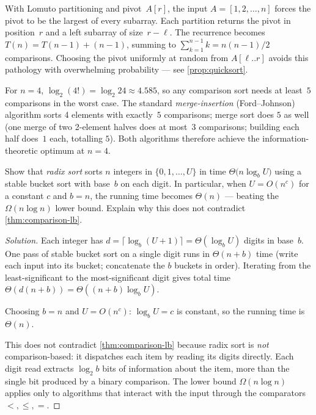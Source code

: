 \begin{example}
\label{ex:quicksort-worst}
With Lomuto partitioning and pivot~$A[r]$, the input $A = [1, 2, \dots, n]$
forces the pivot to be the largest of every subarray. Each partition
returns the pivot in position~$r$ and a left subarray of size~$r - \ell$.
The recurrence becomes $T(n) = T(n - 1) + (n - 1)$, summing to
$\sum_{k=1}^{n-1} k = n(n-1)/2$ comparisons. Choosing the pivot
uniformly at random from $A[\ell..r]$ avoids this pathology with
overwhelming probability — see \cref{prop:quicksort}.
\end{example}

\begin{example}
\label{ex:lb-tight}
For $n = 4$, $\log_2 (4!) = \log_2 24 \approx 4.585$, so any
comparison sort needs at least~$5$ comparisons in the worst case.
The standard \emph{merge-insertion} (Ford--Johnson) algorithm sorts
4 elements with exactly~$5$ comparisons; merge sort does
$5$ as well (one merge of two 2-element halves does at most~$3$
comparisons; building each half does~$1$ each, totalling $5$). Both
algorithms therefore achieve the information-theoretic optimum at
$n = 4$.
\end{example}

\begin{problem}
\label{prob:radix-sort}
Show that \emph{radix sort} sorts $n$ integers in $\{0, 1, \dots, U\}$
in time $\Theta\bigl(n \log_b U\bigr)$ using a stable bucket sort with
base~$b$ on each digit. In particular, when
$U = O(n^c)$ for a constant $c$ and $b = n$, the running time becomes
$\Theta(n)$ — beating the $\Omega(n \log n)$ lower bound. Explain
why this does not contradict \cref{thm:comparison-lb}.
\end{problem}

\begin{proof}[Solution]
Each integer has $d = \lceil \log_b(U + 1) \rceil = \Theta(\log_b U)$
digits in base~$b$. One pass of stable bucket sort on a single digit
runs in $\Theta(n + b)$ time (write each input into its bucket;
concatenate the $b$ buckets in order). Iterating from the
least-significant to the most-significant digit gives total time
$\Theta(d (n + b)) = \Theta((n + b) \log_b U)$.

Choosing $b = n$ and $U = O(n^c)$: $\log_b U = c$ is constant, so the
running time is $\Theta(n)$.

This does not contradict \cref{thm:comparison-lb} because radix sort
is \emph{not} comparison-based: it dispatches each item by reading
its digits directly. Each digit read extracts $\log_2 b$ bits of
information about the item, more than the single bit produced by a
binary comparison. The lower bound $\Omega(n \log n)$ applies only
to algorithms that interact with the input through the comparators
$<, \le, =$.
\end{proof}
